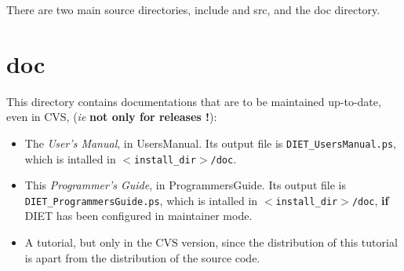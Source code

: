 

There are two main source directories, \textsf{include} and \textsf{src}, and
the \textsf{doc} directory.


\section{\textsf{doc}}
\label{s:doc}

This directory contains documentations that are to be maintained up-to-date,
  even in CVS, (\emph{ie} \textbf{not only for releases !}):

  \begin{itemize}
  \item The \textit{User's Manual}, in \textsf{UsersManual}. Its output file is
  \texttt{DIET\_UsersManual.ps}, which is intalled in
  \texttt{$<$install\_dir$>$/doc}.
  \item This \textit{Programmer's Guide}, in \textsf{ProgrammersGuide}. Its output
  file is \texttt{DIET\_ProgrammersGuide.ps}, which is intalled in
  \texttt{$<$install\_dir$>$/doc}, \textbf{if} DIET has been configured in
  maintainer mode.
  \item A tutorial, but only in the CVS version, since the distribution of this
  tutorial is apart from the distribution of the source code.
  \end{itemize}


